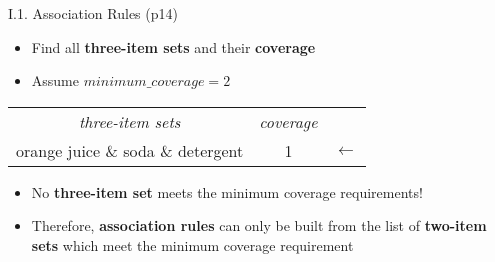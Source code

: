 \documentclass[handout]{beamer}
\newcommand{\strong}[1]{\textbf{\color{teal} #1}}
\begin{document}
\begin{frame}{I.1. Association Rules (p14)}
\begin{itemize}
\item Find all \strong{three-item sets} and their \strong{coverage}
\item Assume $minimum\_coverage=2$
\end{itemize}
\begin{center}
\begin{tabular}{|c|c|l}
\emph{three-item sets} & \emph{coverage} \\
\cline{1-2}
orange juice \& soda \& detergent & 1 & $\leftarrow$ \\
\cline{1-2}
\end{tabular}
\end{center}
\begin{itemize}
\item No \strong{three-item set} meets the minimum coverage requirements!
\item Therefore, \strong{association rules} can only be built from the list of \strong{two-item sets} which meet the minimum coverage requirement
\end{itemize}
\end{frame}
\end{document}
